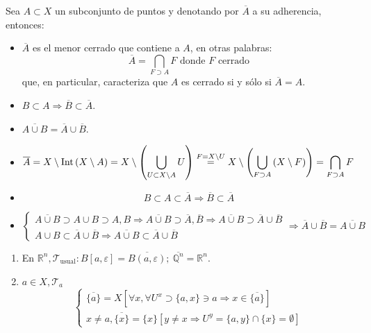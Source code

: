\begin{prop}
Sea $A\subset X$ un subconjunto de puntos y denotando por $\overline{A}$ a su adherencia, entonces:
\begin{itemize}
\item $\overline{A}$ es el menor cerrado que contiene a $A$, en otras palabras:
$$
\overline{A} = \bigcap_{F \supset A} F \mbox{ donde }F \mbox{ cerrado}
$$
que, en particular, caracteriza que $A$ es cerrado si y sólo si $\overline{A} = A$.

\item $B \subset A \Rightarrow \overline{B} \subset \overline{A}$.
\item $\overline{A \cup B} = \overline{A} \cup \overline{B}$.
\end{itemize}
\end{prop}
\begin{demo}
\begin{itemize}
\item 
$$
\overline{A} = X \setminus \operatorname{Int}\left( X \setminus A \right) = X \setminus \left(\bigcup_{U \subset X \setminus A} U \right) \stackrel{F = X \setminus U}{=} X \setminus \left(\bigcup_{F \supset A} \left( X \setminus F \right) \right) = \bigcap_{F \supset A} F
$$
\item
$$
B\subset A \subset \overline{A} \Rightarrow \overline{B} \subset \overline{A}
$$
\item
$$
\begin{cases}
	\overline{A\cup B} \supset A \cup B \supset
		A,B \Rightarrow \overline{A\cup B} \supset
		\overline{A}, \overline{B} \Rightarrow \overline{A\cup B} \supset \overline{A} \cup \overline{B} \\
	A \cup B \subset \overline{A} \cup \overline{B} \Rightarrow \overline{A\cup B} \subset \overline{A} \cup \overline{B}
\end{cases} \Rightarrow \overline{A}\cup \overline{B} = \overline{A\cup B}
$$
\end{itemize}
\end{demo}

\begin{ej}
\begin{enumerate}
    \item En $\mathbb{R}^n, \mathcal{T}_{\text{usual}}: B\left[ a, \varepsilon \right] = \overline{B \left( a, \varepsilon \right)};\ \overline{\mathbb{Q}^n} = \mathbb{R}^n$.
    \item $a \in X, \mathcal{T}_a$
    \[
        \begin{cases}
        \overline{\{a\}} = X \left[ \forall x, \forall U^x \supset \{a, x\} \ni a \Rightarrow x \in \overline{\{a\}} \right]\\
        x \neq a, \overline{\{x\}} = \{x\} \left[ y\neq x \Rightarrow U^y = \{a, y\} \cap \{x\} = \emptyset \right] 
        \end{cases} 
    \]
\end{enumerate}
\end{ej}

